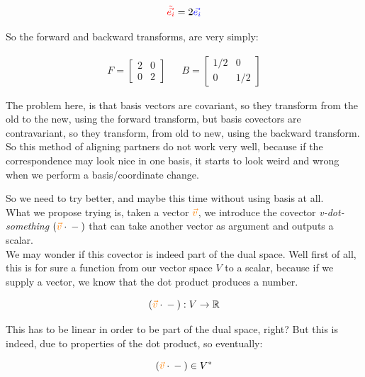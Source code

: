 \begin{equation}
    \begingroup\color{red}\tilde{\vec{e_i}}\endgroup = 2 \begingroup\color{blue}\vec{e_i}\endgroup
\end{equation}

So the forward and backward transforms, are very simply:

\begin{align*}
    F = \begin{bmatrix}
        2 & 0\\
        0 & 2
        \end{bmatrix}  &&  B = \begin{bmatrix}
        1/2 & 0\\
        0 & 1/2
        \end{bmatrix}
\end{align*}

The problem here, is that basis vectors are covariant, so they transform from the old 
to the new, using the forward transform, but basis covectors are contravariant, so they transform, from
old to new, using the backward transform.\\
So this method of aligning partners do not work very well, because if the correspondence may look nice in one basis, 
it starts to look weird and wrong when we perform a basis/coordinate change.

So we need to try better, and maybe this time without using basis at all.\\
What we propose trying is, taken a vector $\begingroup\color{orange}\vec{v}\endgroup$, we introduce the covector \textit{v-dot-something}
$\left(\begingroup\color{orange}\vec{v}\endgroup \cdot  {{} - {}} \right)$ that can take another vector as argument 
and outputs a scalar.\\
We may wonder if this covector is indeed part of the dual space.
Well first of all, this is for sure a function from our vector space $\textit{V}$ to a scalar, because
if we supply a vector, we know that the dot product produces a number.

\begin{equation}
    \left(\begingroup\color{orange}\vec{v}\endgroup \cdot  {{} - {}} \right) : V \to \mathbb{R}
\end{equation}

This has to be linear in order to be part of the dual space, right?
But this is indeed, due to properties of the dot product, so eventually:

\begin{equation}
    \left(\begingroup\color{orange}\vec{v}\endgroup \cdot  {{} - {}} \right) \in V^*
\end{equation}

